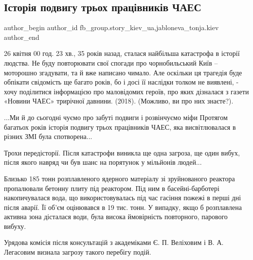 
 
 
 
 
 
\subsection{Історія подвигу трьох працівників ЧАЕС}
\label{sec:27_04_2021.fb.fb_group.story_kiev_ua.1.podvig_chaes}
 
\ifcmt
 author_begin
   author_id fb_group.story_kiev_ua,jabloneva_tonja.kiev
 author_end
\fi

26 квітня 00 год. 23 хв., 35 років назад, сталася найбільша катастрофа в історії
людства. Не буду повторювати свої спогади про чорнобильський Київ – моторошно
згадувати, та й вже написано чимало. Але оскільки ця трагедія  буде обпікати
свідомість ще багато років, бо і досі її наслідки толком не виявлені, - хочу
поділитися інформацією про маловідомих героїв, про яких дізналася з  газети
«Новини ЧАЕС» трирічної давнини. (2018). (Можливо, ви про них знаєте?).


...Ми й до сьогодні чуємо про забуті подвиги і  розвінчуємо міфи Протягом
багатьох років історія подвигу трьох працівників ЧАЕС, яка висвітлювалася в
різних ЗМІ була спотворена... 

Трохи передісторії. Після катастрофи виникла ще одна загроза, ще один вибух,
після якого навряд чи був шанс на порятунок у мільйонів людей...

Близько 185 тонн розплавленого ядерного матеріалу зі зруйнованого реактора
пропалювали бетонну плиту під реактором. Під ним в басейні-барботері
накопичувалася вода, що використовувалась під час гасіння пожежі в перші дні
після аварії. Її об'єм оцінювався  в 19 тис. тонн. У випадку, якщо б
розплавлена активна зона дісталася води, була висока ймовірність повторного,
парового вибуху.

Урядова комісія після консультацій з академіками Є. П. Веліховим і В. А.
Легасовим визнала загрозу такого перебігу подій. 

